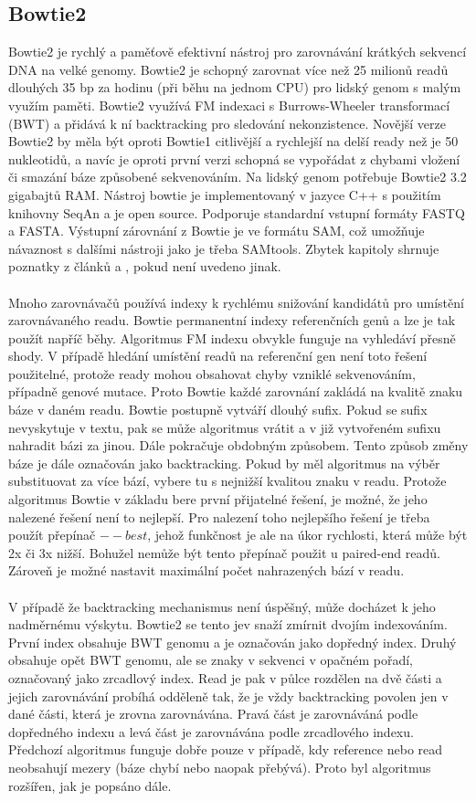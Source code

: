 \documentclass[czech,DP]{thesiskiv}
\numberwithin{equation}{section}
\begin{document}
\subsection{Bowtie2}
Bowtie2 je rychlý a paměťově efektivní nástroj pro zarovnávání krátkých sekvencí DNA na velké genomy. Bowtie2 je schopný zarovnat více než 25 milionů readů dlouhých 35 bp za hodinu (při běhu na jednom CPU) pro lidský genom s malým využím paměti. Bowtie2 využívá FM indexaci s Burrows-Wheeler transformací (BWT) a přidává k ní backtracking pro sledování nekonzistence. Novější verze Bowtie2 by měla být oproti Bowtie1 citlivější a rychlejší na delší ready než je 50 nukleotidů, a navíc je oproti první verzi schopná se vypořádat z chybami vložení či smazání báze způsobené sekvenováním. Na lidský genom potřebuje Bowtie2 3.2 gigabajtů RAM. Nástroj bowtie je implementovaný v jazyce C++ s použitím knihovny SeqAn a je open source. Podporuje standardní vstupní formáty FASTQ a FASTA.  Výstupní zárovnání z Bowtie je ve formátu SAM, což umožňuje návaznost s dalšími nástroji jako je třeba SAMtools. Zbytek kapitoly shrnuje poznatky z článků \cite{bowtie} a \cite{bowtie2}, pokud není uvedeno jinak.   
\\
\\
Mnoho zarovnávačů používá indexy k rychlému snižování kandidátů pro umístění zarovnávaného readu. Bowtie permanentní indexy referenčních genů a lze je tak použít napříč běhy. Algoritmus FM indexu obvykle funguje na vyhledáví přesně shody. V případě hledání umístění readů na referenční gen není toto řešení použitelné, protože ready mohou obsahovat chyby vzniklé sekvenováním, případně genové mutace. Proto Bowtie každé zarovnání zakládá na kvalitě znaku báze v daném readu. Bowtie postupně vytváří dlouhý sufix. Pokud se sufix nevyskytuje v textu, pak se může algoritmus vrátit a v již vytvořeném sufixu nahradit bázi za jinou. Dále pokračuje obdobným způsobem. Tento způsob změny báze je dále označován jako backtracking. Pokud by měl algoritmus na výběr substituovat za více bází, vybere tu s nejnižší kvalitou znaku v readu. Protože algoritmus Bowtie v základu bere první přijatelné řešení, je možné, že jeho nalezené řešení není to nejlepší. Pro nalezení toho nejlepšího řešení je třeba použít přepínač $--best$, jehož funkčnost je ale na úkor rychlosti, která může být 2x či 3x nižší. Bohužel nemůže být tento přepínač použit u paired-end readů. Zároveň je možné nastavit maximální počet nahrazených bází v readu. \cite{bowtie}
\\
\\
V případě že backtracking mechanismus není úspěšný, může docházet k jeho nadměrnému výskytu. Bowtie2 se tento jev snaží zmírnit dvojím indexováním. První index obsahuje BWT genomu a je označován jako dopředný index. Druhý obsahuje opět BWT genomu, ale se znaky v sekvenci v opačném pořadí, označovaný jako zrcadlový index. Read je pak v půlce rozdělen na dvě části a jejich zarovnávání probíhá odděleně tak, že je vždy backtracking povolen jen v dané části, která je zrovna zarovnávána. Pravá část je zarovnáváná podle dopředného indexu a levá část je zarovnávána podle zrcadlového indexu. Předchozí algoritmus funguje dobře pouze v případě, kdy reference nebo read neobsahují mezery (báze chybí nebo naopak přebývá). Proto byl algoritmus rozšířen, jak je popsáno dále.
\end{document}
